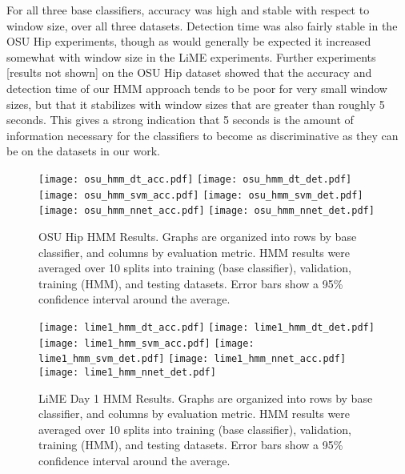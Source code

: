 For all three base classifiers, accuracy was high and
stable with respect to window size, over all three datasets. Detection
time was also fairly stable in the OSU Hip experiments, though as would
generally be expected it increased somewhat with window size in the LiME
experiments. Further experiments [results not shown] on the
OSU Hip dataset showed that the accuracy and detection time of our HMM approach 
tends to be poor for very small window sizes, but that it stabilizes with window sizes
that are greater than roughly 5 seconds. This gives a strong indication that
5 seconds is the amount of information necessary for the classifiers to become as
discriminative as they can be on the datasets in our work.
 
\begin{figure}[H]
 \centering
 \texttt{[image: osu\_hmm\_dt\_acc.pdf]} \hspace{1em}\vspace{1em}
 \texttt{[image: osu\_hmm\_dt\_det.pdf]}
 \texttt{[image: osu\_hmm\_svm\_acc.pdf]} \hspace{1em}\vspace{1em}
 \texttt{[image: osu\_hmm\_svm\_det.pdf]}
 \texttt{[image: osu\_hmm\_nnet\_acc.pdf]} \hspace{1em}
 \texttt{[image: osu\_hmm\_nnet\_det.pdf]}
 \caption{OSU Hip HMM Results.
  Graphs are organized into rows by base classifier, and columns by evaluation
  metric. HMM results were averaged over 10 splits into training
  (base classifier), validation, training (HMM), and testing datasets. Error
  bars show a 95\% confidence interval around the average.}
 \label{fig:osu_hmm}
\end{figure}

\begin{figure}[H]
 \centering
 \texttt{[image: lime1\_hmm\_dt\_acc.pdf]} \hspace{1em}\vspace{1em}
 \texttt{[image: lime1\_hmm\_dt\_det.pdf]} 
 \texttt{[image: lime1\_hmm\_svm\_acc.pdf]} \hspace{1em}\vspace{1em}
 \texttt{[image: lime1\_hmm\_svm\_det.pdf]} 
 \texttt{[image: lime1\_hmm\_nnet\_acc.pdf]} \hspace{1em}
 \texttt{[image: lime1\_hmm\_nnet\_det.pdf]} 
 \caption{LiME Day 1 HMM Results.
  Graphs are organized into rows by base classifier, and columns by evaluation
  metric. HMM results were averaged over 10 splits into training
  (base classifier), validation, training (HMM), and testing datasets. Error
  bars show a 95\% confidence interval around the average.}
 \label{fig:lime1_hmm}
\end{figure}

